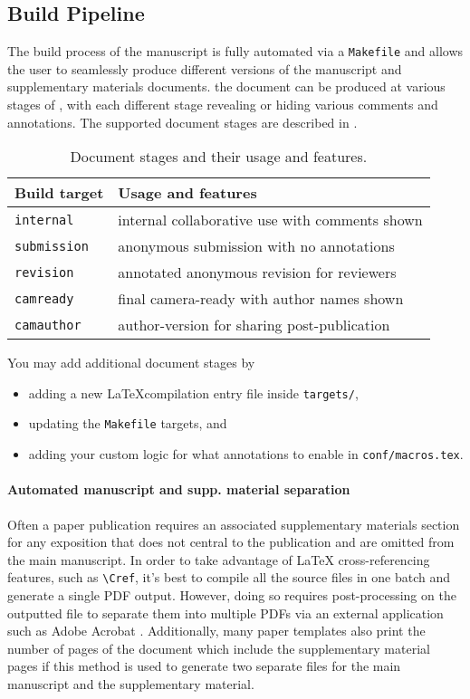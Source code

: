 \subsection{Build Pipeline}
\label{sec:howto:build-pipeline}

The build process of the manuscript is fully automated via a \texttt{Makefile} and allows the user to seamlessly produce different versions of the manuscript and supplementary materials documents.
\ie the document can be produced at various stages of , with each different stage revealing or hiding various comments and annotations.
The supported document stages are described in .
%
\begin{table}[h]
    \caption{Document stages and their usage and features.}
    \label{tab:howto:doc-stages}
    \begin{tabular}{ll}
        \toprule
        Build target & Usage and features\\
        \midrule
        \texttt{internal} & internal collaborative use with comments shown\\
        \texttt{submission} & anonymous submission with no annotations\\
        \texttt{revision} & annotated anonymous revision for reviewers\\
        \texttt{camready} & final camera-ready with author names shown\\
        \texttt{camauthor} & author-version for sharing post-publication\\
        \bottomrule
    \end{tabular}
\end{table}

You may add additional document stages by
%
\begin{itemize}
    \item adding a new \LaTeX compilation entry file inside \texttt{targets/},
    \item updating the \texttt{Makefile} targets, and
    \item adding your custom logic for what annotations to enable in \texttt{conf/macros.tex}.
\end{itemize}

\paragraph{Automated manuscript and supp. material separation}
Often a paper publication requires an associated supplementary materials section for any exposition that does not central to the publication and are omitted from the main manuscript.
In order to take advantage of \LaTeX\xspace cross-referencing features, such as \texttt{\textbackslash Cref}, it's best to compile all the source files in one batch and generate a single PDF output.
However, doing so requires post-processing on the outputted file to separate them into multiple PDFs via an external application such as Adobe Acrobat \etc.
Additionally, many paper templates also print the number of pages of the document which include the supplementary material pages if this method is used to generate two separate files for the main manuscript and the supplementary material.

